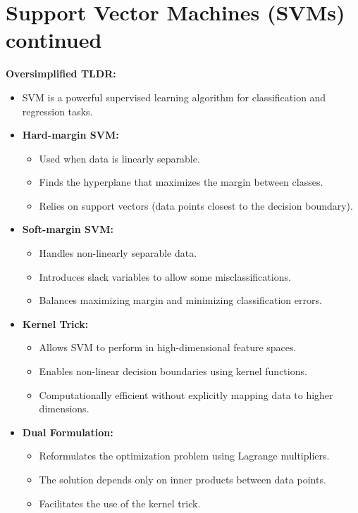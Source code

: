 \documentclass{article}
\begin{document}
\section{Support Vector Machines (SVMs) continued}

\textbf{Oversimplified TLDR:}
\begin{itemize}
    \item SVM is a powerful supervised learning algorithm for classification and regression tasks.
    \item \textbf{Hard-margin SVM:}
    \begin{itemize}
        \item Used when data is linearly separable.
        \item Finds the hyperplane that maximizes the margin between classes.
        \item Relies on support vectors (data points closest to the decision boundary).
    \end{itemize}
    \item \textbf{Soft-margin SVM:}
    \begin{itemize}
        \item Handles non-linearly separable data.
        \item Introduces slack variables to allow some misclassifications.
        \item Balances maximizing margin and minimizing classification errors.
    \end{itemize}
    \item \textbf{Kernel Trick:}
    \begin{itemize}
        \item Allows SVM to perform in high-dimensional feature spaces.
        \item Enables non-linear decision boundaries using kernel functions.
        \item Computationally efficient without explicitly mapping data to higher dimensions.
    \end{itemize}
    \item \textbf{Dual Formulation:}
    \begin{itemize}
        \item Reformulates the optimization problem using Lagrange multipliers.
        \item The solution depends only on inner products between data points.
        \item Facilitates the use of the kernel trick.
    \end{itemize}
\end{itemize}
\end{document}
